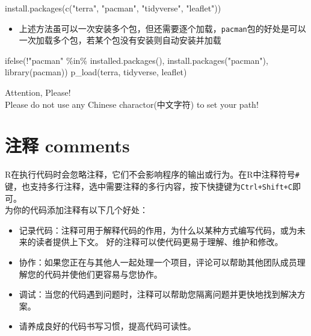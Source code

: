 \documentclass[
]{book}
\newenvironment{Shaded}{\begin{snugshade}}{\end{snugshade}}
\newcommand{\FunctionTok}[1]{\textcolor[rgb]{0.00,0.00,0.00}{#1}}
\newcommand{\NormalTok}[1]{#1}
\newcommand{\SpecialCharTok}[1]{\textcolor[rgb]{0.00,0.00,0.00}{#1}}
\newcommand{\StringTok}[1]{\textcolor[rgb]{0.31,0.60,0.02}{#1}}
\providecommand{\tightlist}{%
  \setlength{\itemsep}{0pt}\setlength{\parskip}{0pt}}
\begin{document}
\begin{Shaded}
\begin{Highlighting}[]
\FunctionTok{install.packages}\NormalTok{(}\FunctionTok{c}\NormalTok{(}\StringTok{"terra"}\NormalTok{, }\StringTok{"pacman"}\NormalTok{, }\StringTok{"tidyverse"}\NormalTok{, }\StringTok{"leaflet"}\NormalTok{))}
\end{Highlighting}
\end{Shaded}

\begin{itemize}
\tightlist
\item
  上述方法虽可以一次安装多个包，但还需要逐个加载，\texttt{pacman}包的好处是可以一次加载多个包，若某个包没有安装则自动安装并加载
\end{itemize}

\begin{Shaded}
\begin{Highlighting}[]
\FunctionTok{ifelse}\NormalTok{(}\SpecialCharTok{!}\StringTok{"pacman"} \SpecialCharTok{\%in\%} \FunctionTok{installed.packages}\NormalTok{(), }\FunctionTok{install.packages}\NormalTok{(}\StringTok{"pacman"}\NormalTok{),}
       \FunctionTok{library}\NormalTok{(pacman))}
\FunctionTok{p\_load}\NormalTok{(terra, tidyverse, leaflet)}
\end{Highlighting}
\end{Shaded}

{Attention, Please!}\\
Please do not use any {Chinese charactor(中文字符)} to set your path!

\hypertarget{ux6ce8ux91ca-comments}{%
\section{注释 comments}\label{ux6ce8ux91ca-comments}}

R在执行代码时会忽略注释，它们不会影响程序的输出或行为。在R中注释符号\texttt{\#}键，也支持多行注释，选中需要注释的多行内容，按下快捷键为\texttt{Ctrl+Shift+C}即可。\\
为你的代码添加注释有以下几个好处：

\begin{itemize}
\tightlist
\item
  记录代码：注释可用于解释代码的作用，为什么以某种方式编写代码，或为未来的读者提供上下文。 好的注释可以使代码更易于理解、维护和修改。\\
\item
  协作：如果您正在与其他人一起处理一个项目，评论可以帮助其他团队成员理解您的代码并使他们更容易与您协作。\\
\item
  调试：当您的代码遇到问题时，注释可以帮助您隔离问题并更快地找到解决方案。\\
\item
  请养成良好的代码书写习惯，提高代码可读性。
\end{itemize}
\end{document}
